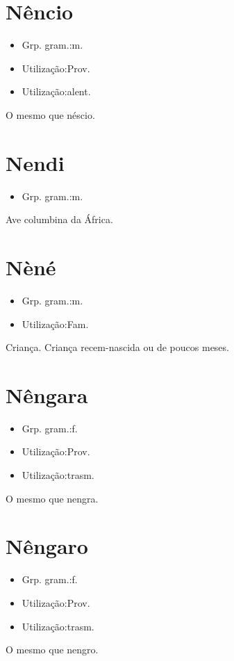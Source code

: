 \section{Nêncio}
\begin{itemize}
\item {Grp. gram.:m.}
\end{itemize}
\begin{itemize}
\item {Utilização:Prov.}
\end{itemize}
\begin{itemize}
\item {Utilização:alent.}
\end{itemize}
O mesmo que \textunderscore néscio\textunderscore .
\section{Nendi}
\begin{itemize}
\item {Grp. gram.:m.}
\end{itemize}
Ave columbina da África.
\section{Nèné}
\begin{itemize}
\item {Grp. gram.:m.}
\end{itemize}
\begin{itemize}
\item {Utilização:Fam.}
\end{itemize}
Criança.
Criança recem-nascida ou de poucos meses.
\section{Nêngara}
\begin{itemize}
\item {Grp. gram.:f.}
\end{itemize}
\begin{itemize}
\item {Utilização:Prov.}
\end{itemize}
\begin{itemize}
\item {Utilização:trasm.}
\end{itemize}
O mesmo que \textunderscore nengra\textunderscore .
\section{Nêngaro}
\begin{itemize}
\item {Grp. gram.:f.}
\end{itemize}
\begin{itemize}
\item {Utilização:Prov.}
\end{itemize}
\begin{itemize}
\item {Utilização:trasm.}
\end{itemize}
O mesmo que \textunderscore nengro\textunderscore .
